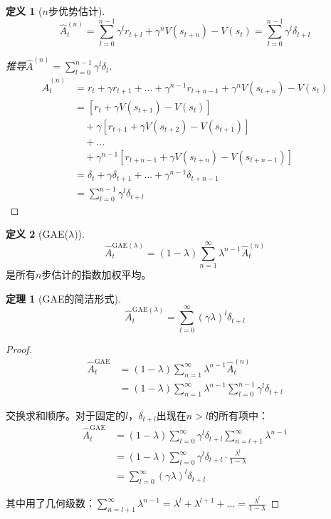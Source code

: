 \documentclass[11pt,a4paper]{article}
\theoremstyle{definition}
\newtheorem{definition}{定义}[section]
\newtheorem{theorem}{定理}[section]
\begin{document}
\begin{definition}[$n$步优势估计]
\[
\hat{A}^{(n)}_t = \sum_{l=0}^{n-1} \gamma^l r_{t+l} + \gamma^n V(s_{t+n}) - V(s_t) = \sum_{l=0}^{n-1} \gamma^l \delta_{t+l}
\]
\end{definition}

\begin{proof}[推导$\hat{A}^{(n)} = \sum_{l=0}^{n-1} \gamma^l \delta_l$]
\begin{align*}
\hat{A}^{(n)}_t &= r_t + \gamma r_{t+1} + ... + \gamma^{n-1} r_{t+n-1} + \gamma^n V(s_{t+n}) - V(s_t) \\
&= [r_t + \gamma V(s_{t+1}) - V(s_t)] \\
&\quad + \gamma[r_{t+1} + \gamma V(s_{t+2}) - V(s_{t+1})] \\
&\quad + ... \\
&\quad + \gamma^{n-1}[r_{t+n-1} + \gamma V(s_{t+n}) - V(s_{t+n-1})] \\
&= \delta_t + \gamma \delta_{t+1} + ... + \gamma^{n-1} \delta_{t+n-1} \\
&= \sum_{l=0}^{n-1} \gamma^l \delta_{t+l}
\end{align*}
\end{proof}

\begin{definition}[GAE($\lambda$)]
\[
\hat{A}^{\text{GAE}(\lambda)}_t = (1-\lambda) \sum_{n=1}^\infty \lambda^{n-1} \hat{A}^{(n)}_t
\]
是所有$n$步估计的指数加权平均。
\end{definition}

\begin{theorem}[GAE的简洁形式]
\[
\hat{A}^{\text{GAE}(\lambda)}_t = \sum_{l=0}^\infty (\gamma\lambda)^l \delta_{t+l}
\]
\end{theorem}

\begin{proof}
\begin{align*}
\hat{A}^{\text{GAE}}_t &= (1-\lambda) \sum_{n=1}^\infty \lambda^{n-1} \hat{A}^{(n)}_t \\
&= (1-\lambda) \sum_{n=1}^\infty \lambda^{n-1} \sum_{l=0}^{n-1} \gamma^l \delta_{t+l}
\end{align*}

交换求和顺序。对于固定的$l$，$\delta_{t+l}$出现在$n > l$的所有项中：
\begin{align*}
\hat{A}^{\text{GAE}}_t &= (1-\lambda) \sum_{l=0}^\infty \gamma^l \delta_{t+l} \sum_{n=l+1}^\infty \lambda^{n-1} \\
&= (1-\lambda) \sum_{l=0}^\infty \gamma^l \delta_{t+l} \cdot \frac{\lambda^l}{1-\lambda} \\
&= \sum_{l=0}^\infty (\gamma\lambda)^l \delta_{t+l}
\end{align*}

其中用了几何级数：$\sum_{n=l+1}^\infty \lambda^{n-1} = \lambda^l + \lambda^{l+1} + ... = \frac{\lambda^l}{1-\lambda}$
\end{proof}
\end{document}
